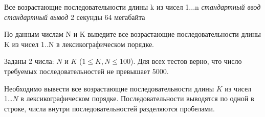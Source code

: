 \begin{problem}%
{Все возрастающие последовательности длины k из чисел 1...n}%
{\textsl{стандартный ввод}}%
{\textsl{стандартный вывод}}%
{2 секунды}%
{64 мегабайта}{}

По данным числам N и K выведите все возрастающие последовательности длины K из чисел 1..N в лексикографическом порядке.

\InputFile

Заданы 2 числа: $N$ и $K$ ($1 \le K, N \le 100$). Для всех тестов верно, что число требуемых последовательностей не превышает 5000.

\OutputFile

Необходимо вывести все возрастающие последовательности длины $K$ из чисел 1\dots$N$ в лексикографическом порядке. Последовательности выводятся по одной в строке, числа внутри последовательностей разделяются пробелами.

\Examples

\begin{example}
%
\end{example}
\end{problem}